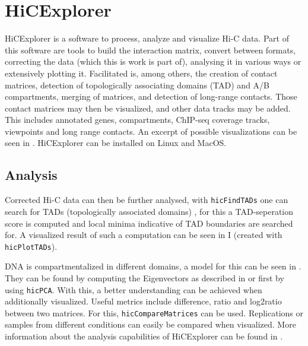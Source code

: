 \section{HiCExplorer}\label{sec:hicexplorer}



HiCExplorer \cite{wolff2018galaxy} is a software to process, analyze and
visualize Hi-C data. Part of this software are tools to build the interaction
matrix, convert between formats, correcting the data (which this is work is
part of), analysing it in various ways or extensively plotting it.
Facilitated is, among others, the creation of contact matrices, detection of
topologically associating domains (TAD) and A/B compartments, merging of
matrices, and detection of long-range contacts\footnotemark. Those contact
matrices may then be visualized, and other data tracks may be added. This
includes annotated genes, compartments, ChIP-seq coverage tracks, viewpoints
and long range contacts\footnotemark[\value{footnote}]. An excerpt of possible
visualizations can be seen in . HiCExplorer can be
installed on Linux and MacOS.




\subsection{Analysis}\label{sec:analysis}



Corrected Hi-C data can then be further analysed, with \verb|hicFindTADs| one
can search for TADs (topologically associated domains) \cite{ramirez2018high},
for this a TAD-seperation score is computed and local minima indicative of TAD
boundaries are searched for. A visualized result of such a computation can be
seen in I (created with \verb|hicPlotTADs|).

DNA is compartmentalized \cite{lieberman2009comprehensive} in different
domains, a model for this can be seen in . They
can be found by computing the Eigenvectors as described in
\cite{lieberman2009comprehensive} or \cite{imakaev2012iterative} first by using
\verb|hicPCA|. With this, a better understanding can be achieved when
additionally visualized. Useful metrics include difference, ratio and log2ratio
between two matrices. For this, \verb|hicCompareMatrices| can be used.
Replications or samples from different conditions can easily be compared when
visualized. More information about the analysis capabilities of HiCExplorer can
be found in \cite{wolff2018galaxy}.

